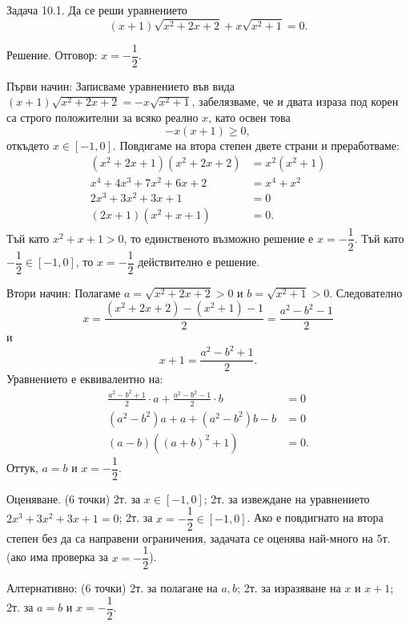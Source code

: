 
Задача 10.1. Да се реши уравнението
$$
(x+1)\sqrt{x^2+2x+2}+x\sqrt{x^2+1}=0.
$$

Решение. Отговор: $x=-\dfrac12$.

Първи начин: Записваме уравнението във вида $(x+1)\sqrt{x^2+2x+2}=-x\sqrt{x^2+1}$, забелязваме, че и двата израза под корен са строго положителни за всяко реално $x$, като освен това
$$
-x(x+1)\geq0,
$$
откъдето $x\in[-1,0]$. Повдигаме на втора степен двете страни и преработваме:
$$
\begin{aligned}
(x^2+2x+1)(x^2+2x+2)&=x^2(x^2+1)\\
x^4+4x^3+7x^2+6x+2&=x^4+x^2\\
2x^3+3x^2+3x+1&=0\\
(2x+1)(x^2+x+1)&=0.
\end{aligned}
$$
Тъй като $x^2+x+1>0$, то единственото възможно решение е $x=-\dfrac12$. Тъй като $-\dfrac12\in[-1,0]$, то $x=-\dfrac12$ действително е решение.

Втори начин: Полагаме $a=\sqrt{x^2+2x+2}>0$ и $b=\sqrt{x^2+1}>0$. Следователно
$$
x=\frac{(x^2+2x+2)-(x^2+1)-1}{2}=\frac{a^2-b^2-1}{2}
$$
и
$$
x+1=\frac{a^2-b^2+1}{2}.
$$
Уравнението е еквивалентно на:
$$
\begin{aligned}
\frac{a^2-b^2+1}{2}\cdot a+\frac{a^2-b^2-1}{2}\cdot b&=0\\
(a^2-b^2)a+a+(a^2-b^2)b-b&=0\\
(a-b)((a+b)^2+1)&=0.
\end{aligned}
$$
Оттук, $a=b$ и $x=-\dfrac12$.

Оценяване. (6 точки) 2т. за $x\in[-1,0]$; 2т. за извеждане на уравнението $2x^3+3x^2+3x+1=0$; 2т. за $x=-\dfrac12\in[-1,0]$. Ако е повдигнато на втора степен без да са направени ограничения, задачата се оценява най-много на 5т. (ако има проверка за $x=-\dfrac12$).

Алтернативно: (6 точки) 2т. за полагане на $a,b$; 2т. за изразяване на $x$ и $x+1$; 2т. за $a=b$ и $x=-\dfrac12$.

